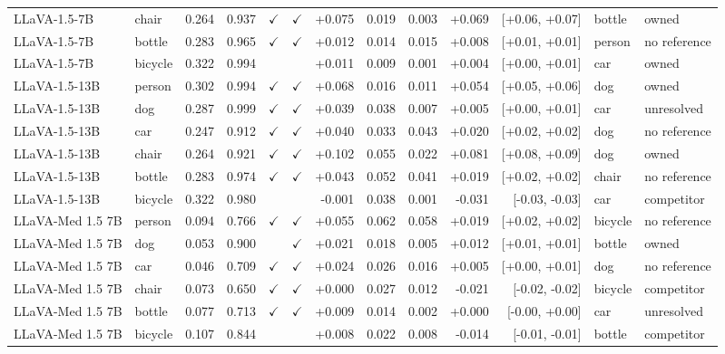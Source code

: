 \begin{longtable}{llrrccrrrrrll}
\rowcolor{cfSlate2}LLaVA-1.5-7B & chair & 0.264 & 0.937 & $\checkmark$ & $\checkmark$ & +0.075 & 0.019 & 0.003 & +0.069 & [+0.06, +0.07] & bottle & owned \\
LLaVA-1.5-7B & bottle & 0.283 & 0.965 & $\checkmark$ & $\checkmark$ & +0.012 & 0.014 & 0.015 & +0.008 & [+0.01, +0.01] & person & no reference \\
\rowcolor{cfSlate2}LLaVA-1.5-7B & bicycle & 0.322 & 0.994 &  &  & +0.011 & 0.009 & 0.001 & +0.004 & [+0.00, +0.01] & car & owned \\
\rowcolor{cfSlate2}LLaVA-1.5-13B & person & 0.302 & 0.994 & $\checkmark$ & $\checkmark$ & +0.068 & 0.016 & 0.011 & +0.054 & [+0.05, +0.06] & dog & owned \\
LLaVA-1.5-13B & dog & 0.287 & 0.999 & $\checkmark$ & $\checkmark$ & +0.039 & 0.038 & 0.007 & +0.005 & [+0.00, +0.01] & car & unresolved \\
LLaVA-1.5-13B & car & 0.247 & 0.912 & $\checkmark$ & $\checkmark$ & +0.040 & 0.033 & 0.043 & +0.020 & [+0.02, +0.02] & dog & no reference \\
\rowcolor{cfSlate2}LLaVA-1.5-13B & chair & 0.264 & 0.921 & $\checkmark$ & $\checkmark$ & +0.102 & 0.055 & 0.022 & +0.081 & [+0.08, +0.09] & dog & owned \\
LLaVA-1.5-13B & bottle & 0.283 & 0.974 & $\checkmark$ & $\checkmark$ & +0.043 & 0.052 & 0.041 & +0.019 & [+0.02, +0.02] & chair & no reference \\
LLaVA-1.5-13B & bicycle & 0.322 & 0.980 &  &  & -0.001 & 0.038 & 0.001 & -0.031 & [-0.03, -0.03] & car & competitor \\
LLaVA-Med 1.5 7B & person & 0.094 & 0.766 & $\checkmark$ & $\checkmark$ & +0.055 & 0.062 & 0.058 & +0.019 & [+0.02, +0.02] & bicycle & no reference \\
\rowcolor{cfSlate2}LLaVA-Med 1.5 7B & dog & 0.053 & 0.900 &  & $\checkmark$ & +0.021 & 0.018 & 0.005 & +0.012 & [+0.01, +0.01] & bottle & owned \\
LLaVA-Med 1.5 7B & car & 0.046 & 0.709 & $\checkmark$ & $\checkmark$ & +0.024 & 0.026 & 0.016 & +0.005 & [+0.00, +0.01] & dog & no reference \\
LLaVA-Med 1.5 7B & chair & 0.073 & 0.650 & $\checkmark$ & $\checkmark$ & +0.000 & 0.027 & 0.012 & -0.021 & [-0.02, -0.02] & bicycle & competitor \\
LLaVA-Med 1.5 7B & bottle & 0.077 & 0.713 & $\checkmark$ & $\checkmark$ & +0.009 & 0.014 & 0.002 & +0.000 & [-0.00, +0.00] & car & unresolved \\
LLaVA-Med 1.5 7B & bicycle & 0.107 & 0.844 &  &  & +0.008 & 0.022 & 0.008 & -0.014 & [-0.01, -0.01] & bottle & competitor \\

\end{longtable}
